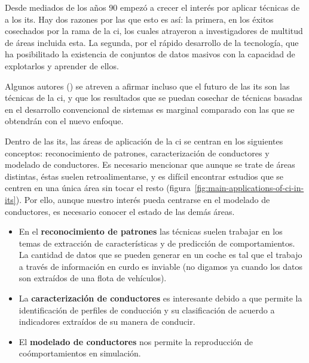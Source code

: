 Desde mediados de los años $90$ empezó a crecer el interés por aplicar técnicas de  a los \gls{its}. Hay dos razones por las que esto es así: la primera, en los éxitos cosechados por la rama de la \gls{ci}, los cuales atrayeron a investigadores de multitud de áreas incluida esta. La segunda, por el rápido desarrollo de la tecnología, que ha posibilitado la existencia de conjuntos de datos masivos con la capacidad de explotarlos y aprender de ellos.

Algunos autores (\cite{Zhang2011}) se atreven a afirmar incluso que el futuro de las \gls{its} son las técnicas de la \gls{ci}, y que los resultados que se puedan cosechar de técnicas basadas en el desarrollo convencional de sistemas es marginal comparado con las que se obtendrán con el nuevo enfoque.

Dentro de las \gls{its}, las áreas de aplicación de la \gls{ci} se centran en los siguientes conceptos: reconocimiento de patrones, caracterización de conductores y modelado de conductores. Es necesario mencionar que aunque se trate de áreas distintas, éstas suelen retroalimentarse, y es difícil encontrar estudios que se centren en una única área sin tocar el resto (figura~\ref{fig:main-applications-of-ci-in-its}). Por ello, aunque nuestro interés pueda centrarse en el modelado de conductores, es necesario conocer el estado de las demás áreas.

\begin{itemize}
	\item En el \textbf{reconocimiento de patrones} las técnicas suelen trabajar en los temas de extracción de características y de predicción de comportamientos. La cantidad de datos que se pueden generar en un coche es tal que el trabajo a través de información en curdo es inviable (no digamos ya cuando los datos son extraídos de una flota de vehículos).
	\item La \textbf{caracterización de conductores} es interesante debido a que permite la identificación de perfiles de conducción y su clasificación de acuerdo a indicadores extraídos de su manera de conducir.
	\item El \textbf{modelado de conductores} nos permite la reproducción de coómportamientos en simulación.
\end{itemize}

